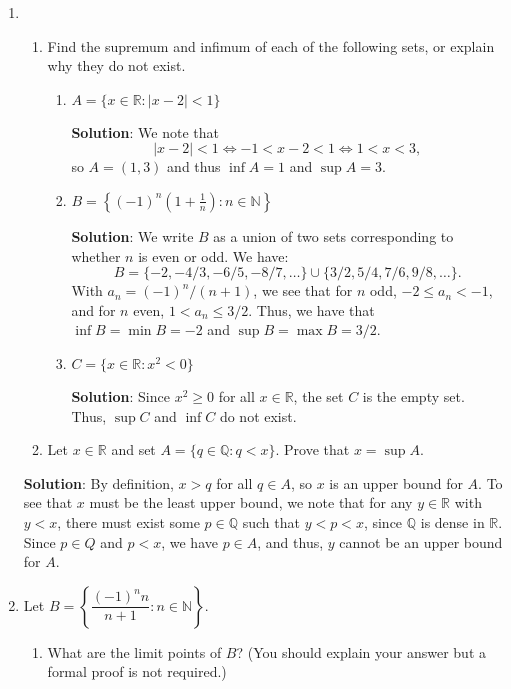\documentclass[12pt]{article}
\newcommand{\points}[1]{\marginpar{\hspace{24pt}[#1]}}
\newcommand{\R}{\mathbb{R}}
\newcommand{\Q}{\mathbb{Q}}
\newcommand{\N}{\mathbb{N}}
\newcommand{\abs}[1]{\lvert #1\rvert}
\begin{document}
\begin{enumerate}
\item \begin{enumerate}
       \item Find the supremum and infimum of each of the following sets, or explain why they do not exist. 
\begin{enumerate}
\item $A = \{x\in\R : \abs{x-2}<1\}$ \points{2}

\bigskip

{\bf Solution}: We note that
\[
 \abs{x-2}<1 \Leftrightarrow -1<x-2<1 \Leftrightarrow 1<x<3,
\]
so $A=(1,3)$ and thus $\inf A = 1$ and $\sup A = 3$.

\bigskip

\item $B = \left\{(-1)^n\left(1+\frac{1}{n}\right) : n\in\N\right\}$ \points{2}


\bigskip

{\bf Solution}: We write $B$ as a union of two sets corresponding to whether $n$ is even or odd. We have:
\[
 B = \{-2, -4/3, -6/5, -8/7, \ldots\}\cup\{3/2, 5/4, 7/6, 9/8,\ldots\}.
\]
With $a_n = (-1)^n/(n+1)$, we see that for $n$ odd, $-2\leq a_n<-1$, and for $n$ even, $1<a_n\leq 3/2$. Thus, we have that $\inf B = \min B = -2$ and $\sup B = \max B = 3/2$.

\bigskip

\item $C = \{x\in \R : x^2<0\}$ \points{2}


\bigskip

{\bf Solution}: Since $x^2\geq 0$ for all $x\in \R$, the set $C$ is the empty set. Thus, $\sup C$ and $\inf C$ do not exist.

\end{enumerate}
\newpage
\item Let $x\in\R$ and set $A = \{q\in\Q : q<x\}$. Prove that $x=\sup A$. \points{4}
      \end{enumerate}

\bigskip

{\bf Solution}: By definition, $x>q$ for all $q\in A$, so $x$ is an upper bound for $A$. To see that $x$ must be the least upper bound, we note that for any $y\in\R$ with $y<x$, there must exist some $p\in\Q$ such that $y<p<x$, since $\Q$ is dense in $\R$. Since $p\in Q$ and $p<x$, we have $p\in A$, and thus, $y$ cannot be an upper bound for $A$.

\newpage
\item Let $B = \left\{\dfrac{(-1)^nn}{n+1} : n\in\N\right\}$.
\begin{enumerate}
       \item What are the limit points of $B$? (You should explain your answer but a formal proof is not required.)\points{3}



\end{enumerate}
\end{enumerate}
\end{document}
